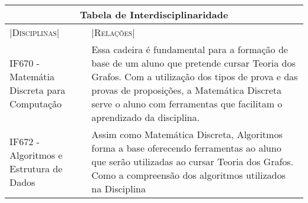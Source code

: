 \documentclass[10pt]{article}
\begin{document}
\begin{tabular}{ |p{7cm}||p{7cm}|}
\hline
\multicolumn{2}{|c|}{\Large{\textbf{Tabela de Interdisciplinaridade}}} \\
\hline
|\large{\textsc{Disciplinas}}|& |\large{\textsc{Relações}}|\\[0.1ex]
\hline

IF670 - Matemátia Discreta para Computação & Essa cadeira é fundamental para a formação de base de um aluno que pretende cursar Teoria dos Grafos. Com a utilização dos tipos de prova e das provas de proposições, a Matemática Discreta serve o aluno com ferramentas que facilitam o aprendizado da disciplina.\\
\hline
IF672 - Algoritmos e Estrutura de Dados & Assim como Matemática Discreta, Algoritmos forma a base oferecendo ferramentas ao aluno que serão utilizadas ao cursar Teoria dos Grafos. Como a compreensão dos algoritmos utilizados na Disciplina\\
\hline 
\end{tabular}\\



\end{document}
